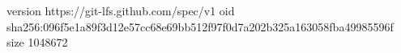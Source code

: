 version https://git-lfs.github.com/spec/v1
oid sha256:096f5e1a89f3d12e57cc68e69bb512f97f0d7a202b325a163058fba49985596f
size 1048672
